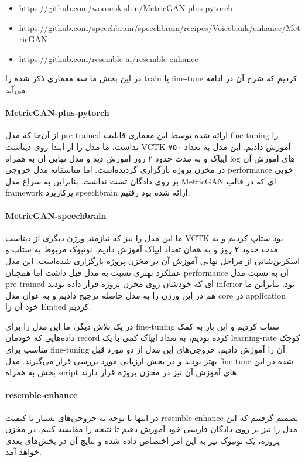\documentclass[fleqn]{report}
\begin{document}
\begin{itemize}
    \item https://github.com/wooseok-shin/MetricGAN-plus-pytorch
    \item https://github.com/speechbrain/speechbrain/recipes/Voicebank/enhance/MetricGAN
    \item https://github.com/resemble-ai/resemble-enhance
\end{itemize}

در این بخش ما سه معماری ذکر شده را train یا fine-tune کردیم که شرح آن در ادامه می‌آید.

\paragraph{MetricGAN-plus-pytorch}
از آن‌جا که مدل pre-trained ارائه شده توسط این معماری قابلیت fine-tuning را نداشت، ما مدل را از ابتدا روی دیتاست VCTK آموزش دادیم.
این مدل به تعداد ۷۵۰ ایپاک و به مدت حدود ۲ روز آموزش دید و مدل نهایی آن به همراه log های آموزش آن در مخزن پروژه بارگزاری گردیده‌است.
اما متاسفانه مدل خروجی performance خوبی بر روی دادگان تست نداشت. بنابراین به سراغ مدل MetricGAN ای که در قالب framework پرکاربرد speechbrain ارائه شده بود رفتیم.


\paragraph{MetricGAN-speechbrain}
ما این مدل را نیز که نیازمند ورژن دیگری از دیتاست VCTK بود ستاپ کردیم و به مدت حدود ۲ روز و به همان تعداد ایپاک آموزش دادیم.
نوتبوک مربوط به ستاپ و اسکرین‌شاتی از مراحل نهایی آموزش آن در مخزن پروژه بارگزاری شده‌است.
این مدل عملکرد بهتری نسبت به مدل قبل داشت اما همچنان performance آن به نسبت مدل pre-trained ای که خودشان روی مخزن پروژه قرار داده بودند inferior بود.
بنابراین ما هم در این ورژن را به مدل حاصله ترجیح دادیم و به عوان مدل core در application خود آن را Embed کردیم.

در یک تلاش دیگر، ما این مدل را برای fine-tuning ستاپ کردیم و این بار به کمک داده‌هایی که خودمان record کرده بودیم، به تعداد ایپاک کمی با یک learning-rate کوچک مناسب برای fine-tuning آن را آموزش دادیم.
خروجی‌های این مدل از دو مورد قبل بهتر بودند و در بخش ارزیابی مورد بررسی قرار می‌گیرند.
مدل fine-tune شده در این بخش به همراه script های آموزش آن نیز در مخزن پروژه قرار دارند.


\paragraph{resemble-enhance} 
در انتها با توجه به خروجی‌های بسیار با کیفیت resemble-enhance تصمیم گرفتیم که این مدل را نیز بر روی دادگان فارسی خود آموزش دهیم تا نتیجه را مقایسه کنیم.
در مخزن پروژه، یک نوتبوک نیز به این امر اختصاص داده شده و نتایج آن در بخش‌های بعدی خواهد آمد.
\end{document}
